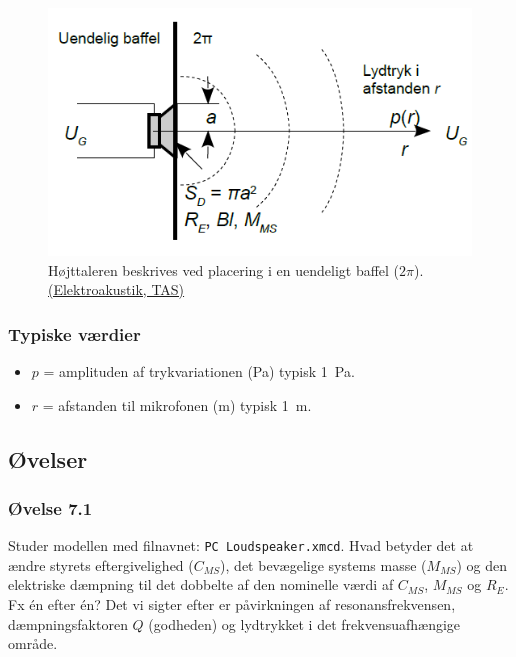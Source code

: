 \begin{figure} [H]
	\centering
	\includegraphics[width=0.7\linewidth]{graphics/29.png}
	\caption{Højttaleren beskrives ved placering i en uendeligt baffel ($2\pi$). \href{http://www.torean.dk/artikel/Elektroakustik.pdf}{(Elektroakustik, TAS)}}
	\label{fig:29}
\end{figure}

\subsubsection{Typiske værdier}
\begin{itemize}
	\item $p$ = amplituden af trykvariationen (\si{\pascal}) typisk \SI{1}{\pascal}.
	\item $r$ = afstanden til mikrofonen (\si{\meter}) typisk \SI{1}{\meter}.
\end{itemize}
\subsection{Øvelser}
\subsubsection{Øvelse 7.1}
Studer modellen med filnavnet: \texttt{PC Loudspeaker.xmcd}. Hvad betyder det at ændre styrets eftergivelighed ($C_{MS}$), det bevægelige systems masse ($M_{MS}$) og den elektriske dæmpning til det dobbelte af den nominelle værdi af $C_{MS}$, $M_{MS}$ og $R_E$. Fx én efter én? 
\newpage \noindent Det vi sigter efter er påvirkningen af resonansfrekvensen, dæmpningsfaktoren $Q$ (godheden) og lydtrykket i det frekvensuafhængige område.

